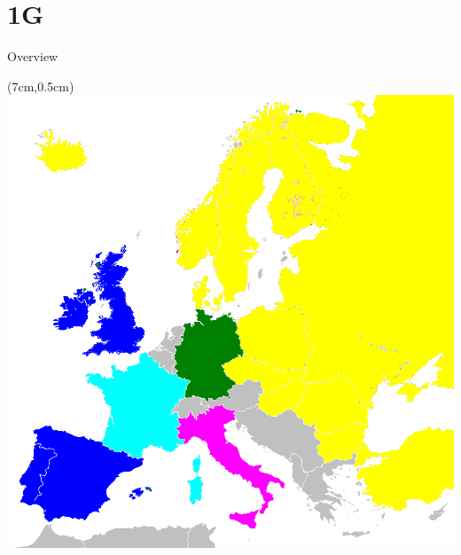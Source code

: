 \documentclass[10pt]{beamer}
\begin{document}
\section{1G}
\begin{frame}{Overview}
  \textblockorigin{0.0cm}{2.0cm}
  \tableofcontents[currentsection]
  
  \begin{textblock*}{6cm}(7cm,0.5cm)
   \includegraphics[width=1\columnwidth]{./pictures/1GNetworkStandards.png}
  \end{textblock*}
\end{frame}




%
\end{document}
